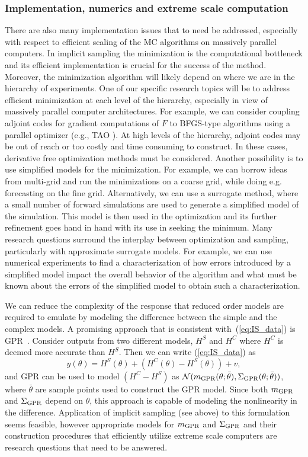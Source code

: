 \documentclass[11pt]{article}
\begin{document}
\subsubsection*{Implementation, numerics and extreme scale computation}
There are also many implementation issues that to need be addressed, especially with respect to efficient scaling of the MC algorithms on massively parallel computers.
In implicit sampling the minimization is the computational bottleneck and its efficient implementation is crucial for the success of the method.
Moreover, the minimization algorithm will likely depend on where we are in the hierarchy of experiments.
One of our specific research topics will be to address efficient minimization at each level of the hierarchy, especially in view of massively parallel computer architectures.
For example, we can consider coupling adjoint codes for gradient computations of $F$ to BFGS-type algorithms using a parallel optimizer (e.g., TAO \cite{tao-man}).
At high levels of the hierarchy, adjoint codes may be out of reach or too costly and time consuming to construct.
In these cases, derivative free optimization methods must be considered.
Another possibility is to use simplified models for the minimization.
For example, we can borrow ideas from multi-grid and run the minimizations on a coarse grid, while doing e.g. forecasting on the fine grid.
Alternatively, we can use a surrogate method, where a small number of forward simulations are used to generate a simplified model of the simulation.
This model is then used in the optimization and its further refinement goes hand in hand with its use in seeking the minimum.
Many research questions surround the interplay between optimization and sampling, particularly with approximate surrogate models.
For example, we can use numerical experiments to find a characterization of how errors introduced by a simplified model impact the overall behavior of the algorithm and what must be known about the errors of the simplified model to obtain such a characterization.  

We can reduce the complexity of the response that reduced order models
are required to emulate by modeling the difference between the simple
and the complex models. A promising approach that is consistent
with~(\ref{eq:IS_data}) is GPR~\cite{Rasmussen:2006vz}. 
Consider outputs from two different models, $H^S$ and $H^C$ where $H^C$ is deemed more accurate than $H^S$. 
Then we can write (\ref{eq:IS_data}) as 
\begin{equation}
y(\theta) = H^S(\theta) + (H^C(\theta) - H^S(\theta)) + v,
\end{equation}
and GPR can be used to model  $(H^C - H^S)$ as $\mathcal{N}(m_{\rm GPR}(\theta;\bar{\theta}),\Sigma_{\rm GPR}(\theta;\bar{\theta}))$, where $\bar{\theta}$ are sample points used to construct the GPR model. Since both $m_{\rm GPR}$ and $\Sigma_{\rm GPR}$ depend on $\theta$, this approach is capable of modeling the nonlinearity in the difference. Application of implicit sampling (see above) to this  formulation seems feasible, however appropriate models for $m_{\rm GPR}$ and $\Sigma_{\rm GPR}$ and their construction procedures that efficiently utilize extreme scale computers are research questions that need to be answered. 
\end{document}
